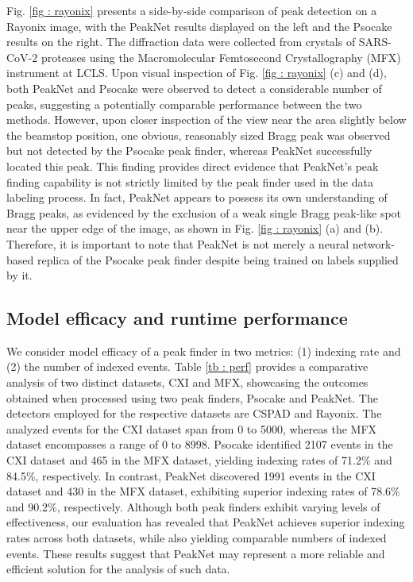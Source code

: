 \documentclass[conference]{IEEEtran}
\newcommand{\peaknet}{PeakNet}
\newcommand{\psocake}{Psocake}
\begin{document}
Fig. \ref{fig : rayonix} presents a side-by-side comparison of peak detection on
a Rayonix image, with the \peaknet{} results displayed on the left and the
\psocake{} results on the right.  The diffraction data were collected from crystals of SARS-CoV-2 proteases using the Macromolecular Femtosecond Crystallography (MFX) instrument \citep{sierraMacromolecularFemtosecondCrystallography2019} at LCLS.  Upon visual inspection of Fig. \ref{fig :
rayonix} (c) and (d), both \peaknet{} and \psocake{} were observed to detect a
considerable number of peaks, suggesting a potentially comparable performance
between the two methods.  However, upon closer inspection of the view near the
area slightly below the beamstop position, one obvious, reasonably sized Bragg
peak was observed but not detected by the \psocake{} peak finder, whereas
\peaknet{} successfully located this peak.  This finding provides direct
evidence that \peaknet{}'s peak finding capability is not strictly limited by
the peak finder used in the data labeling process.  In fact, \peaknet{} appears
to possess its own understanding of Bragg peaks, as evidenced by the exclusion
of a weak single Bragg peak-like spot near the upper edge of the image, as shown
in Fig. \ref{fig : rayonix} (a) and (b).  Therefore, it is important to note that
\peaknet{} is not merely a neural network-based replica of the \psocake{} peak finder
despite being trained on labels supplied by it.


\subsection{Model efficacy and runtime performance}

We consider model efficacy of a peak finder in two metrics: (1) indexing rate
and (2) the number of indexed events.  Table \ref{tb : perf} provides a
comparative analysis of two distinct datasets, CXI and MFX, showcasing the
outcomes obtained when processed using two peak finders, \psocake{} and
\peaknet{}.  The detectors employed for the respective datasets are CSPAD and
Rayonix.  The analyzed events for the CXI dataset span from 0 to 5000, whereas
the MFX dataset encompasses a range of 0 to 8998.  \psocake{} identified 2107
events in the CXI dataset and 465 in the MFX dataset, yielding indexing rates of
71.2\% and 84.5\%, respectively.  In contrast, \peaknet{} discovered 1991
events in the CXI dataset and 430 in the MFX dataset, exhibiting superior
indexing rates of 78.6\% and 90.2\%, respectively.  Although both peak finders
exhibit varying levels of effectiveness, our evaluation has revealed that
\peaknet{} achieves superior indexing rates across both datasets,
while also yielding comparable numbers of indexed events.  These results suggest
that \peaknet{} may represent a more reliable and efficient solution for the
analysis of such data.
\end{document}
